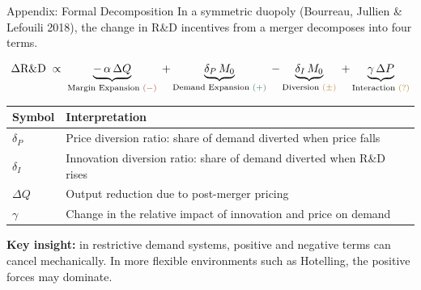 \documentclass[10pt, aspectratio=169]{beamer}
\newcommand{\pos}[1]{\textcolor{softgreen}{#1}}
\newcommand{\negg}[1]{\textcolor{softred}{#1}}
\newcommand{\amb}[1]{\textcolor{softorange}{#1}}
\begin{document}
\begin{frame}{Appendix: Formal Decomposition}
\small
In a symmetric duopoly (Bourreau, Jullien \& Lefouili 2018), the change in R\&D incentives from a merger decomposes into four terms.

\vspace{0.5em}
\[
\Delta \text{R\&D}
\;\propto\;
\underbrace{-\,\alpha\,\Delta Q}_{\text{Margin Expansion }\negg{(-)}}
\;+
\underbrace{\delta_P\,M_0}_{\text{Demand Expansion }\pos{(+)}}
\;-
\underbrace{\delta_I\,M_0}_{\text{Diversion }\amb{(\pm)}}
\;+
\underbrace{\gamma\,\Delta P}_{\text{Interaction }\amb{(?)}}
\]

\vspace{0.6em}
\renewcommand{\arraystretch}{1.28}
\begin{tabular}{>{\bfseries}l l}
\toprule
Symbol & Interpretation \\
\midrule
$\delta_P$ & Price diversion ratio: share of demand diverted when price falls \\
$\delta_I$ & Innovation diversion ratio: share of demand diverted when R\&D rises \\
$\Delta Q$ & Output reduction due to post-merger pricing \\
$\gamma$ & Change in the relative impact of innovation and price on demand \\
\bottomrule
\end{tabular}

\vspace{0.5em}
\textbf{Key insight:} in restrictive demand systems, positive and negative terms can cancel mechanically. In more flexible environments such as Hotelling, the positive forces may dominate.
\end{frame}
\end{document}
